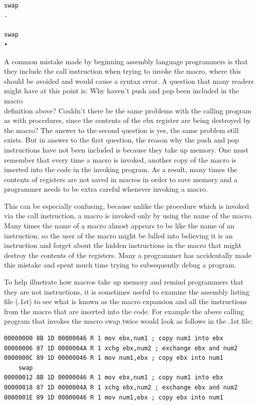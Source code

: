 \documentclass[10pt]{book}
\begin{document}
\begin{verbatim}
 
swap
.
  
swap
•
\end{verbatim}

A common mistake made by beginning assembly language programmers is that they include the call instruction when trying to invoke the macro, where this should be avoided and would cause a syntax error. A question that many readers might have at this point is: Why haven't push and pop been included in the macro\\

definition above? Couldn't there be the same problems with the calling program as with procedures, since the contents of the ebx register are being destroyed by the macro? The answer to the second question is yes, the same problem still exists. But in answer to the first question, the reason why the push and pop instructions have not been included is because they take up memory. One must remember that every time a macro is invoked, another copy of the macro is inserted into the code in the invoking program. As a result, many times the contents of registers are not saved in macros in order to save memory and a programmer needs to be extra careful whenever invoking a macro.

This can be especially confusing, because unlike the procedure which is invoked via the call instruction, a macro is invoked only by using the name of the macro. Many times the name of a macro almost appears to be like the name of an instruction, so the user of the macro might be lulled into believing it is an instruction and forget about the hidden instructions in the macro that might destroy the contents of the registers. Many a programmer has accidentally made this mistake and spent much time trying to subsequently debug a program.

To help illustrate how macros take up memory and remind programmers that they are not instructions, it is sometimes useful to examine the assembly listing file (.1st) to see what is known as the macro expansion and all the instructions from the macro that are inserted into the code. For example the above calling program that invokes the macro swap twice would look as follows in the .1st file:

\begin{verbatim}
00000000 8B 1D 00000046 R 1 mov ebx,num1 ; copy num1 into ebx
00000006 87 1D 0000004A R 1 xchg ebx,num2 ; exchange ebx and num2
0000000C 89 1D 00000046 R 1 mov num1,ebx ; copy ebx into num1
    swap
00000012 8B 1D 00000046 R 1 mov ebx,num1 ; copy num1 into ebx
00000018 87 1D 0000004A R 1 xchg ebx,num2 ; exchange ebx and num2
0000001E 89 1D 00000046 R 1 mov num1,ebx ; copy ebx into num1
\end{verbatim}
\end{document}
